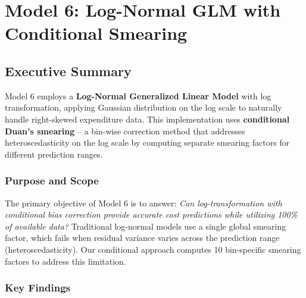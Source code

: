 
\chapter{Model 6: Log-Normal GLM with Conditional Smearing}\label{ch:model6}




\def\themodel{6}

\section{Executive Summary}

Model 6 employs a \textbf{Log-Normal Generalized Linear Model} with log transformation, applying Gaussian distribution on the log scale to naturally handle right-skewed expenditure data. This implementation uses \textbf{conditional Duan's smearing} -- a bin-wise correction method that addresses heteroscedasticity on the log scale by computing separate smearing factors for different prediction ranges.

\subsection{Purpose and Scope}

The primary objective of Model 6 is to answer: \textit{Can log-transformation with conditional bias correction provide accurate cost predictions while utilizing 100\% of available data?} Traditional log-normal models use a single global smearing factor, which fails when residual variance varies across the prediction range (heteroscedasticity). Our conditional approach computes 10 bin-specific smearing factors to address this limitation.

\subsection{Key Findings}

